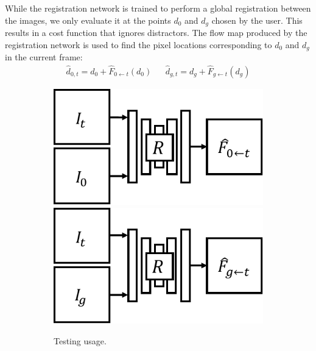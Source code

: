 While the registration network is trained to perform a global registration between the images, we only evaluate it at the points $d_0$ and $d_g$ chosen by the user. This results in a cost function that ignores distractors. The flow map produced by the registration network is used to find the pixel locations corresponding to $d_0$ and $d_g$ in the current frame: 
\begin{align}
\hat{d}_{0,t} = d_0 + \hat{F}_{0 \leftarrow t}(d_0) &&
\hat{d}_{g,t} = d_g + \hat{F}_{g \leftarrow t}(d_g)
\label{eqn:warped_pos}
\end{align}


\begin{figure}[t!]
	\centering
	\begin{subfigure}[b]{0.35\linewidth}
		\centering
		\includegraphics[width=\linewidth]{images_rfr/registration_test_start.pdf}\vspace{2.5mm}
		\includegraphics[width=\linewidth]{images_rfr/registration_test_goal.pdf}
		\caption{\small{Testing usage.}}
	\end{subfigure}
	\quad \quad
	\begin{subfigure}[b]{0.55\linewidth}

\end{subfigure}
\end{figure}
